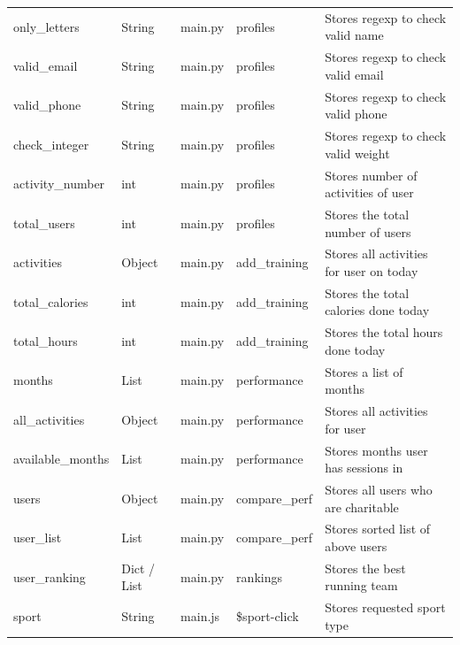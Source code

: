 \documentclass{article}[12pt,a4paper]
\begin{document}
\begin{table}[h]
\begin{tabular}{lllll}
only\_letters     & String        & main.py             & profiles                  & Stores regexp to check valid name       \\
valid\_email      & String        & main.py             & profiles                  & Stores regexp to check valid email      \\
valid\_phone      & String        & main.py             & profiles                  & Stores regexp to check valid phone      \\
check\_integer    & String        & main.py             & profiles                  & Stores regexp to check valid weight     \\
activity\_number  & int           & main.py             & profiles                  & Stores number of activities of user     \\
total\_users      & int           & main.py             & profiles                  & Stores the total number of users        \\
activities        & Object        & main.py             & add\_training             & Stores all activities for user on today \\
total\_calories   & int           & main.py             & add\_training             & Stores the total calories done today    \\
total\_hours      & int           & main.py             & add\_training             & Stores the total hours done today       \\
months            & List          & main.py             & performance               & Stores a list of months                 \\
all\_activities   & Object        & main.py             & performance               & Stores all activities for user          \\
available\_months & List          & main.py             & performance               & Stores months user has sessions in      \\
users             & Object        & main.py             & compare\_perf             & Stores all users who are charitable     \\
user\_list        & List          & main.py             & compare\_perf             & Stores sorted list of above users       \\
user\_ranking     & Dict / List   & main.py             & rankings                  & Stores the best running team            \\
sport             & String        & main.js             & \$sport-click             & Stores requested sport type             \\

\end{tabular}
\end{table}
\end{document}

